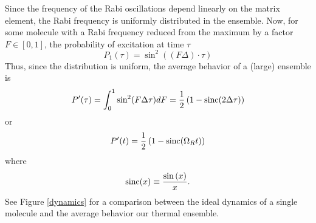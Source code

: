 

Since the frequency of the Rabi oscillations depend linearly on the matrix element, the Rabi frequency is uniformly distributed in the ensemble. Now, for some molecule with a Rabi frequency reduced from the maximum by a factor $F\in[0,1]$, the probability of excitation at time $\tau$
\begin{equation}
P_1(\tau)
=
\sin^2((F\Delta)\cdot\tau)
\end{equation}
Thus, since the distribution is uniform, the average behavior of a (large) ensemble is
\begin{equation}
P^{\prime}(\tau)
=
\int^{1}_{0}
\sin^2(F\Delta\tau)
dF
=
\frac{1}{2}
\left(
1-
{\rm sinc}{(2\Delta\tau)}
\right)
\label{initial eom}
\end{equation}
or
\begin{equation}
P^{\prime}(t)
=
\frac{1}{2}
\left(
1-
{\rm sinc}{(\Omega_R t)}
\right)
\label{initial eom normal}
\end{equation}
where
\begin{equation}
{\rm sinc}{(x)}
\equiv
\frac
{\sin{(x)}}
{x}.
\end{equation}
See Figure \ref{dynamics} for a comparison between the ideal dynamics of a single molecule and the average behavior our thermal ensemble.

